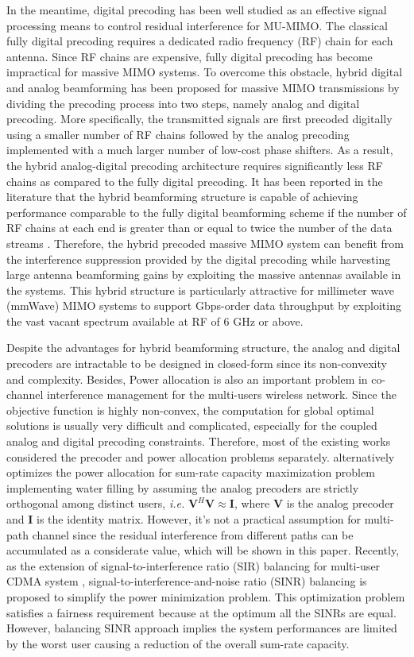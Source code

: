 \documentclass[10pt,journal,twocolumn,twoside]{IEEEtran}
\begin{document}
In the meantime, digital precoding has been well studied as an effective signal processing means to control residual interference for MU-MIMO. The classical fully digital precoding requires a dedicated radio frequency (RF) chain for each antenna. Since RF chains are expensive, fully digital precoding has become impractical for massive MIMO systems. To overcome this obstacle, hybrid digital and analog beamforming has been proposed for massive MIMO transmissions by dividing the precoding process into two steps, namely analog and digital precoding. More specifically, the transmitted signals are first precoded digitally using a smaller number of RF chains followed by the analog precoding implemented with a much larger number of low-cost phase shifters. As a result, the hybrid analog-digital precoding architecture requires significantly less RF chains as compared to the fully digital precoding. It has been reported in the literature that the hybrid beamforming structure is capable of achieving performance comparable to the fully digital beamforming scheme if the number of RF chains at each end is greater than or equal to twice the number of the data streams \cite{han2014reference}. Therefore, the hybrid precoded massive MIMO system can benefit from the interference suppression provided by the digital precoding while harvesting large antenna beamforming gains by exploiting the massive antennas available in the systems. This hybrid structure is particularly attractive for millimeter wave (mmWave) MIMO systems to support Gbps-order data throughput by exploiting the vast vacant spectrum available at RF of $6$ GHz or above.

Despite the advantages for hybrid beamforming structure, the analog and digital precoders are intractable to be designed in closed-form since its non-convexity and complexity.  
Besides, Power allocation is also an important problem in co-channel interference management for the multi-users wireless network. Since the objective function is highly non-convex, the computation for global optimal solutions is usually very difficult and complicated, especially for the coupled analog and digital precoding constraints. Therefore, most of the existing works considered the precoder and power allocation problems separately. \cite{sohrabi2016hybrid} alternatively optimizes the power allocation for sum-rate capacity maximization problem implementing water filling by assuming the analog precoders are strictly orthogonal among distinct users, \textit{i.e.} $\bm{V}^H \bm{V} \approx \bm{I}$, where $\bm{V}$ is the analog precoder and $\bm{I}$ is the identity matrix. However, it's not a practical assumption for multi-path channel since the residual interference from different paths can be accumulated as a considerate value, which will be shown in this paper. Recently, as the extension of  signal-to-interference ratio (SIR) balancing for multi-user CDMA system \cite{koskie2005nash},  signal-to-interference-and-noise ratio (SINR) balancing is proposed to simplify the power minimization problem. This optimization problem satisfies a fairness requirement because at the optimum all the SINRs are equal. However,  balancing SINR approach implies the system performances are limited by the worst user causing a reduction of the overall sum-rate capacity. 
\end{document}
